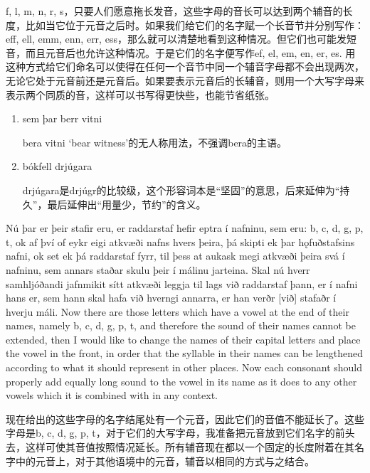 \begin{translation*}{}
    f, l, m, n, r, s，只要人们愿意拖长发音，这些字母的音长可以达到两个辅音的长度，比如当它位于元音之后时。如果我们给它们的名字赋一个长音节并分别写作：eff, ell, emm, enn, err, ess，那么就可以清楚地看到这种情况。但它们也可能发短音，而且元音后也允许这种情况。于是它们的名字便写作ef, el, em, en, er, es. 用这种方式给它们命名可以使得在任何一个音节中同一个辅音字母都不会出现两次，无论它处于元音前还是元音后。如果要表示元音后的长辅音，则用一个大写字母来表示两个同质的音，这样可以书写得更快些，也能节省纸张。
\end{translation*}
\begin{grammar*}{}
    \begin{enumerate}[leftmargin=*]
        \item sem þar berr vitni

              bera vitni `bear witness'的无人称用法，不强调bera的主语。

        \item bókfell drjúgara

              drjúgara是drjúgr的比较级，这个形容词本是“坚固”的意思，后来延伸为“持久”，最后延伸出“用量少，节约”的含义。
    \end{enumerate}
\end{grammar*}
\begin{paracol}{2}
    Nú þar er þeir stafir eru, er raddarstaf hefir eptra í nafninu, sem eru: b, c, d, g, p, t, ok af því of eykr eigi atkvæði nafns hvers þeira, þá skipti ek þar hǫfuðstafsins nafni, ok set ek þá raddarstaf fyrr, til þess at aukask megi atkvæði þeira svá í nafninu, sem annars staðar skulu þeir í málinu jarteina. Skal nú hverr samhljóðandi jafnmikit sítt atkvæði leggja til lags við raddarstaf þann, er í nafni hans er, sem hann skal hafa við hverngi annarra, er han verðr [við] stafaðr í hverju máli.
    \switchcolumn
    Now there are those letters which have a vowel at the end of their names, namely b, c, d, g, p, t, and therefore the sound of their names cannot be extended, then I would like to change the names of their capital letters and place the vowel in the front, in order that the syllable in their names can be lengthened according to what it should represent in other places. Now each consonant should properly add equally long sound to the vowel in its name as it does to any other vowels which it is combined with in any context.
\end{paracol}
\begin{translation*}{}
    现在给出的这些字母的名字结尾处有一个元音，因此它们的音值不能延长了。这些字母是b, c, d, g, p, t，对于它们的大写字母，我准备把元音放到它们名字的前头去，这样可使其音值按照情况延长。所有辅音现在都以一个固定的长度附着在其名字中的元音上，对于其他语境中的元音，辅音以相同的方式与之结合。
\end{translation*}
